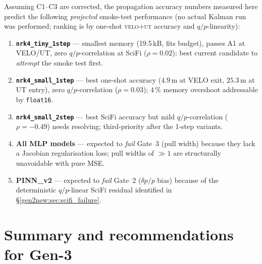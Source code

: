 \documentclass[a4paper,11pt]{article}
\begin{document}
Assuming C1--C3 are corrected, the propagation accuracy numbers
measured here predict the following \emph{projected} smoke-test
performance (no actual Kalman run was performed; ranking is by
one-shot \textsc{velo}+\textsc{ut} accuracy and $q/p$-linearity):

\begin{enumerate}
  \item \textbf{\texttt{nrk4\_tiny\_1step}} --- smallest memory
        (19.5\,kB, fits budget), passes A1 at VELO/UT, zero
        $q/p$-correlation at SciFi ($\rho=0.02$); best current
        candidate to \emph{attempt} the smoke test first.
  \item \textbf{\texttt{nrk4\_small\_1step}} --- best one-shot
        accuracy ($4.9$\,\textmu m at VELO exit,
        $25.3$\,\textmu m at UT entry), zero $q/p$-correlation
        ($\rho=0.03$); $4\,\%$ memory overshoot addressable by
        \texttt{float16}.
  \item \textbf{\texttt{nrk4\_small\_2step}} --- best SciFi accuracy
        but mild $q/p$-correlation ($\rho=-0.49$) needs resolving;
        third-priority after the 1-step variants.
  \item \textbf{All MLP models} --- expected to \emph{fail} Gate~3
        (pull width) because they lack a Jacobian regularisation
        loss; pull widths of $\gg1$ are structurally unavoidable
        with pure MSE.
  \item \textbf{PINN\_v2} --- expected to \emph{fail} Gate~2
        ($\delta p/p$ bias) because of the deterministic
        $q/p$-linear SciFi residual identified in
        §\ref{gen2new:sec:scifi_failure}.
\end{enumerate}

\section{Summary and recommendations for Gen-3}\label{gen2new:sec:summary}
\end{document}
